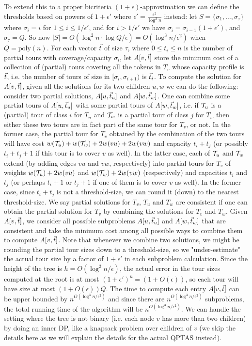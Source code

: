 \documentclass[twoside,leqno]{article}
\newcommand{\eps}{\epsilon}
\newcommand{\poly}{\text{poly}}
\begin{document}
To extend this to a proper bicriteria $(1+\epsilon)$-approximation we can define the thresholds based on powers of
$1+\epsilon'$ where $\epsilon'=\frac{\epsilon^2}{\log^2 n}$ instead: let
$S = \{\sigma_1, \ldots, \sigma_\tau \}$ where $\sigma_i=i$ for $1\leq i\leq 1/\epsilon'$, and
for $i>1/\epsilon'$ we have $\sigma_i = \sigma_{i-1}(1 + \eps')$, and $\sigma_\tau = Q$. So now
$|S|=O(\log^2 n\cdot\log Q/\epsilon)=O(\log^3 n/\epsilon^2)$ when $Q = \poly(n)$. For each vector $\vec{t}$ of size $\tau$, where $0\leq t_i\leq n$
is the number of partial tours with coverage/capacity $\sigma_i$, let $A[v,\vec{t}]$ store the minimum cost of a collection of
(partial) tours covering all the tokens in $T_v$ whose capacity profile is $\vec{t}$, i.e. the number of
tours of size in $[\sigma_i,\sigma_{i+1})$ is $\vec{t}_i$. To compute the solution for $A[v,\vec{t}]$,
given all the solutions for its two children $u,w$ we can do the following: consider two partial solutions,
$A[u,\vec{t}_u]$ and $A[w,\vec{t}_w]$. One can combine some partial tours of $A[u,\vec{t}_u]$ with some partial tours of $A[w,\vec{t}_w]$,
i.e. if ${\cal T}_u$  is a (partial) tour of class $i$ for $T_u$ and ${\cal T}_w$ is a partial tour of class $j$ for $T_w$
then either these two tours are in fact part of the same tour for $T_v$, or not. In the former case, the partial tour
for $T_v$ obtained by the combination of the two tours will have cost $w({\cal T}_u)+w({\cal T}_w)+2w(vu)+2w(vw)$ and capacity
$t_i+t_j$ (or possibly $t_i+t_j+1$ if this tour is to cover $v$ as well).
In the latter case, each of ${\cal T}_u$ and ${\cal T}_w$ extend (by adding edges $vu$ and $vw$, respectively) into
partial tours for $T_v$ of weights $w({\cal  T}_u)+2w(vu)$ and $w({\cal  T}_w)+2w(vw)$ (respectively)  and capacities $t_i$
and $t_j$ (or perhaps $t_i+1$ or $t_j+1$ if one of them is to cover $v$ as well). In the former case, since $t_i+t_j$ is not
a threshold-size, we can round it (down) to the nearest threshold-size. We say partial solutions for $T_v$, $T_u$ and $T_w$
are consistent if one can obtain the partial solution for $T_v$ by combining the solutions for $T_v$ and $T_w$. Given
$A[v,\vec{t}]$, we consider all possible subproblems $A[u,\vec{t}_u]$ and $A[w,\vec{t}_w]$ that are consistent and take the minimum cost among
all possible ways to combine them to compute $A[v,\vec{t}]$.
Note that whenever we combine two solutions, we might be rounding
the partial tour sizes down to a threshold-size, so we "under-estimate" the actual tour size by a factor
of $1+\epsilon'$ in each subproblem calculation. Since the height of the tree is $h=O(\log^2 n/\epsilon)$, the actual error in the tour sizes computed at the root is at most $(1+\epsilon')^h=(1+O(\epsilon))$, so each tour will have size at most $(1+O(\epsilon))Q$. The time to compute each entry $A[v,\vec{t}]$ can be upper bounded
by $n^{O(\log^3 n/\epsilon^2)}$ and since there are $n^{O(\log^3 n/\epsilon^2)}$ subproblems,
the total running time of the algorithm will be $n^{O(\log^3 n/\epsilon^2)}$. We can handle the setting where the tree is not binary  (i.e. each node $v$ has more than two children) by doing an inner DP, like a knapsack problem over children of $v$
(we skip the details here as we will explain the details for the actual QPTAS instead).
\end{document}
